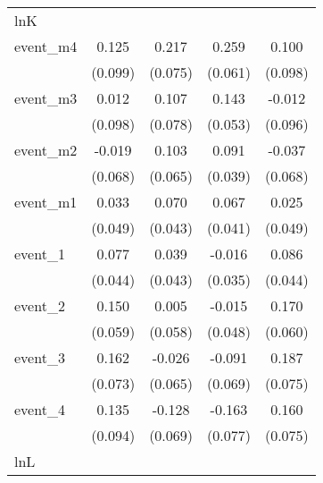 \begin{table}[htbp]
\begin{tabular}{l*{4}{c}}
\hline
lnK         &                     &                     &                     &                     \\
event\_m4    &       0.125         &       0.217\sym{**} &       0.259\sym{***}&       0.100         \\
            &     (0.099)         &     (0.075)         &     (0.061)         &     (0.098)         \\
[1em]
event\_m3    &       0.012         &       0.107         &       0.143\sym{**} &      -0.012         \\
            &     (0.098)         &     (0.078)         &     (0.053)         &     (0.096)         \\
[1em]
event\_m2    &      -0.019         &       0.103         &       0.091\sym{*}  &      -0.037         \\
            &     (0.068)         &     (0.065)         &     (0.039)         &     (0.068)         \\
[1em]
event\_m1    &       0.033         &       0.070         &       0.067         &       0.025         \\
            &     (0.049)         &     (0.043)         &     (0.041)         &     (0.049)         \\
[1em]
event\_1     &       0.077         &       0.039         &      -0.016         &       0.086         \\
            &     (0.044)         &     (0.043)         &     (0.035)         &     (0.044)         \\
[1em]
event\_2     &       0.150\sym{*}  &       0.005         &      -0.015         &       0.170\sym{**} \\
            &     (0.059)         &     (0.058)         &     (0.048)         &     (0.060)         \\
[1em]
event\_3     &       0.162\sym{*}  &      -0.026         &      -0.091         &       0.187\sym{*}  \\
            &     (0.073)         &     (0.065)         &     (0.069)         &     (0.075)         \\
[1em]
event\_4     &       0.135         &      -0.128         &      -0.163\sym{*}  &       0.160\sym{*}  \\
            &     (0.094)         &     (0.069)         &     (0.077)         &     (0.075)         \\
\hline
lnL         &                     &                     &                     &                     \\

\end{tabular}
\end{table}

